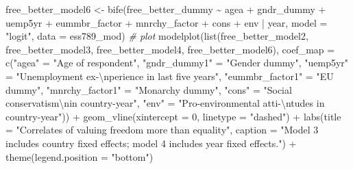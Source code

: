 \documentclass[
]{article}
\newenvironment{Shaded}{\begin{snugshade}}{\end{snugshade}}
\newcommand{\AttributeTok}[1]{\textcolor[rgb]{0.77,0.63,0.00}{#1}}
\newcommand{\CommentTok}[1]{\textcolor[rgb]{0.56,0.35,0.01}{\textit{#1}}}
\newcommand{\DecValTok}[1]{\textcolor[rgb]{0.00,0.00,0.81}{#1}}
\newcommand{\FunctionTok}[1]{\textcolor[rgb]{0.00,0.00,0.00}{#1}}
\newcommand{\NormalTok}[1]{#1}
\newcommand{\OtherTok}[1]{\textcolor[rgb]{0.56,0.35,0.01}{#1}}
\newcommand{\SpecialCharTok}[1]{\textcolor[rgb]{0.00,0.00,0.00}{#1}}
\newcommand{\StringTok}[1]{\textcolor[rgb]{0.31,0.60,0.02}{#1}}
\begin{document}
\begin{Shaded}
\begin{Highlighting}[]
\NormalTok{free\_better\_model6 }\OtherTok{\textless{}{-}} \FunctionTok{bife}\NormalTok{(free\_better\_dummy }\SpecialCharTok{\textasciitilde{}}\NormalTok{ agea }\SpecialCharTok{+}\NormalTok{ gndr\_dummy }\SpecialCharTok{+}\NormalTok{ uemp5yr }\SpecialCharTok{+}\NormalTok{ eummbr\_factor }\SpecialCharTok{+}\NormalTok{ mnrchy\_factor }\SpecialCharTok{+}\NormalTok{ cons }\SpecialCharTok{+}\NormalTok{ env }\SpecialCharTok{|}\NormalTok{ year, }
           \AttributeTok{model =} \StringTok{"logit"}\NormalTok{, }\AttributeTok{data =}\NormalTok{ ess789\_mod)}
\CommentTok{\# plot }
\FunctionTok{modelplot}\NormalTok{(}\FunctionTok{list}\NormalTok{(free\_better\_model2, free\_better\_model3, }
\NormalTok{               free\_better\_model4, free\_better\_model6),}
          \AttributeTok{coef\_map =} \FunctionTok{c}\NormalTok{(}\StringTok{"agea"} \OtherTok{=} \StringTok{"Age of respondent"}\NormalTok{,}
                       \StringTok{"gndr\_dummy1"} \OtherTok{=} \StringTok{"Gender dummy"}\NormalTok{, }
                       \StringTok{"uemp5yr"} \OtherTok{=} \StringTok{"Unemployment ex{-}}\SpecialCharTok{\textbackslash{}n}\StringTok{perience in last five years"}\NormalTok{,}
                       \StringTok{"eummbr\_factor1"} \OtherTok{=} \StringTok{"EU dummy"}\NormalTok{, }
                       \StringTok{"mnrchy\_factor1"} \OtherTok{=} \StringTok{"Monarchy dummy"}\NormalTok{,}
                       \StringTok{"cons"} \OtherTok{=} \StringTok{"Social conservatism}\SpecialCharTok{\textbackslash{}n}\StringTok{in country{-}year"}\NormalTok{, }
                       \StringTok{"env"} \OtherTok{=} \StringTok{"Pro{-}environmental atti{-}}\SpecialCharTok{\textbackslash{}n}\StringTok{tudes in country{-}year"}\NormalTok{)) }\SpecialCharTok{+}
  \FunctionTok{geom\_vline}\NormalTok{(}\AttributeTok{xintercept =} \DecValTok{0}\NormalTok{, }\AttributeTok{linetype =} \StringTok{"dashed"}\NormalTok{) }\SpecialCharTok{+}
  \FunctionTok{labs}\NormalTok{(}\AttributeTok{title =} \StringTok{"Correlates of valuing freedom more than equality"}\NormalTok{, }
       \AttributeTok{caption =} \StringTok{"Model 3 includes country fixed effects; model 4 includes year fixed effects."}\NormalTok{) }\SpecialCharTok{+}
  \FunctionTok{theme}\NormalTok{(}\AttributeTok{legend.position =} \StringTok{"bottom"}\NormalTok{)}
\end{Highlighting}
\end{Shaded}
\end{document}
